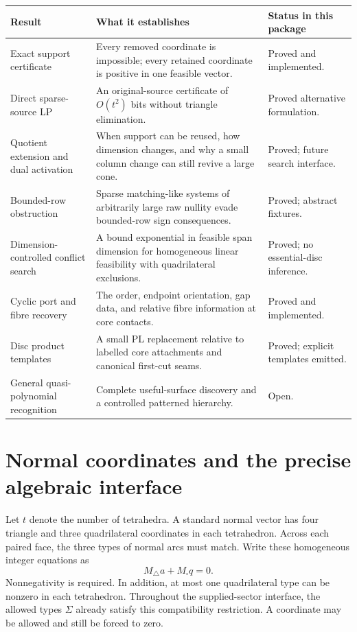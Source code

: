 \documentclass[11pt]{article}
\theoremstyle{definition}
\theoremstyle{remark}
\begin{document}
\begin{longtable}{@{}>{\raggedright\arraybackslash}p{}>{\raggedright\arraybackslash}p{}>{\raggedright\arraybackslash}p{}@{}}
\toprule
Result & What it establishes & Status in this package\\
\midrule
Exact support certificate &
Every removed coordinate is impossible; every retained coordinate is
positive in one feasible vector. & Proved and implemented.\\
Direct sparse-source LP &
An original-source certificate of $O(t^2)$ bits without triangle
elimination. & Proved alternative formulation.\\
Quotient extension and dual activation &
When support can be reused, how dimension changes, and why a small column
change can still revive a large cone. & Proved; future search interface.\\
Bounded-row obstruction &
Sparse matching-like systems of arbitrarily large raw nullity evade
bounded-row sign consequences. & Proved; abstract fixtures.\\
Dimension-controlled conflict search &
A bound exponential in feasible span dimension for homogeneous
linear feasibility with quadrilateral exclusions. &
Proved; no essential-disc inference.\\
Cyclic port and fibre recovery &
The order, endpoint orientation, gap data, and relative fibre information
at core contacts. & Proved and implemented.\\
Disc product templates &
A small PL replacement relative to labelled core attachments and
canonical first-cut seams. & Proved; explicit templates emitted.\\
General quasi-polynomial recognition &
Complete useful-surface discovery and a controlled patterned hierarchy. &
Open.\\
\bottomrule
\end{longtable}

\section{Normal coordinates and the precise algebraic interface}
\label{sec:normal-interface}

Let \(t\) denote the number of tetrahedra. A standard normal vector has
four triangle and three quadrilateral coordinates in each tetrahedron.
Across each paired face, the three types of normal arcs must match.
Write these homogeneous integer equations as
\[
M_\triangle a+M_\square q=0.
\]
Nonnegativity is required. In addition, at most one quadrilateral type
can be nonzero in each tetrahedron. Throughout the supplied-sector
interface, the allowed types \(\Sigma\) already satisfy this compatibility
restriction. A coordinate may be allowed and still be forced to zero.
\end{document}
